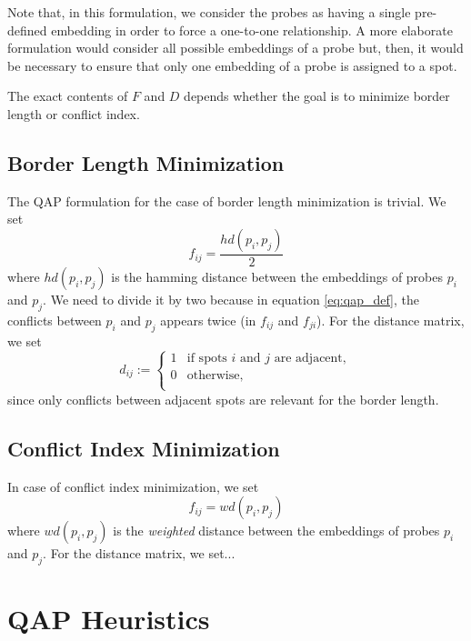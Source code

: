 \documentclass{bioinfo}
\begin{document}
Note that, in this formulation, we consider the probes as having a single pre-defined embedding in order to force a one-to-one relationship. A more elaborate formulation would consider all possible embeddings of a probe but, then, it would be necessary to ensure that only one embedding of a probe is assigned to a spot.

The exact contents of $F$ and $D$ depends whether the goal is to minimize border length or conflict index.

\subsection{Border Length Minimization}

The QAP formulation for the case of border length minimization is trivial. We set
\begin{equation}
f_{ij} = \frac{hd(p_i, p_j)}{2}
\end{equation}
where $hd(p_i, p_j)$ is the hamming distance between the embeddings of probes $p_i$ and $p_j$. We need to divide it by two because in equation \ref{eq:qap_def}, the conflicts between $p_i$ and $p_j$ appears twice (in $f_{ij}$ and $f_{ji}$). For the distance matrix, we set
\begin{equation} d_{ij} :=
        \left\{
                \begin{array}{ll}
                        1 & \mbox{if spots $i$ and $j$ are adjacent}, \\
                        0 & \mbox{otherwise}, \\
                \end{array}
        \right.
\end{equation}
since only conflicts between adjacent spots are relevant for the border length.

\subsection{Conflict Index Minimization}

In case of conflict index minimization, we set
\begin{equation}
f_{ij} = wd(p_i, p_j)
\end{equation}
where $wd(p_i, p_j)$ is the \emph{weighted} distance between the embeddings of probes $p_i$ and $p_j$. For the distance matrix, we set...

\section{QAP Heuristics}
\end{document}
